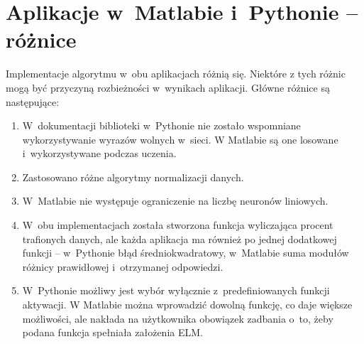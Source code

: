 \documentclass[pl]{minipw} %
\begin{document}
\section{Aplikacje w~Matlabie i~Pythonie -- różnice}
\label{porownanie_aplikacji}
Implementacje algorytmu w~obu aplikacjach różnią się. 
Niektóre z tych różnic mogą być przyczyną rozbieżności w~wynikach aplikacji.
\label{roznice-aplikacji}
Główne różnice są następujące:
\begin{enumerate}
\item W~dokumentacji biblioteki w~Pythonie nie zostało wspomniane wykorzystywanie wyrazów wolnych w~sieci.
W Matlabie są one losowane i~wykorzystywane podczas uczenia.
\item Zastosowano różne algorytmy normalizacji danych.
\item W~Matlabie nie występuje ograniczenie na liczbę neuronów liniowych.
\item W~obu implementacjach została stworzona funkcja wyliczająca procent trafionych danych, ale każda aplikacja ma również po jednej dodatkowej funkcji -- w~Pythonie błąd średniokwadratowy, w~Matlabie suma modułów różnicy prawidłowej i~otrzymanej odpowiedzi.
\item W~Pythonie możliwy jest wybór wyłącznie z~predefiniowanych funkcji aktywacji. 
W Matlabie można wprowadzić dowolną funkcję, co daje większe możliwości, ale nakłada na użytkownika obowiązek zadbania o~to, żeby podana funkcja spełniała założenia ELM.
\end{enumerate}
\end{document}
